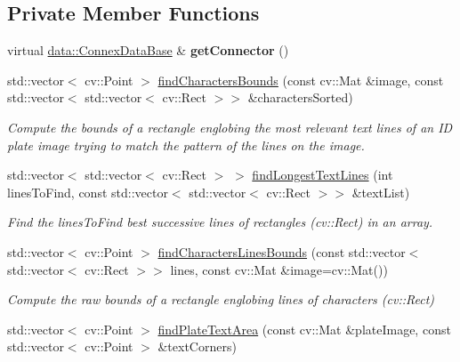 \subsection*{Private Member Functions}
\begin{DoxyCompactItemize}
\item 
\mbox{\label{classfilter_1_1algos_1_1_i_d_plate_rectifier_ad1ed6ad6aff33970529231ec52668020}} 
virtual \hyperlink{classfilter_1_1data_1_1_connex_data_base}{data\+::\+Connex\+Data\+Base} \& {\bfseries get\+Connector} ()
\item 
std\+::vector$<$ cv\+::\+Point $>$ \hyperlink{classfilter_1_1algos_1_1_i_d_plate_rectifier_a93c192fad7dd4402ac189be622e11615}{find\+Characters\+Bounds} (const cv\+::\+Mat \&image, const std\+::vector$<$ std\+::vector$<$ cv\+::\+Rect $>$$>$ \&characters\+Sorted)
\begin{DoxyCompactList}\small\item\em Compute the bounds of a rectangle englobing the most relevant text lines of an ID plate image trying to match the pattern of the lines on the image. \end{DoxyCompactList}\item 
std\+::vector$<$ std\+::vector$<$ cv\+::\+Rect $>$ $>$ \hyperlink{classfilter_1_1algos_1_1_i_d_plate_rectifier_a03f68f887de80fccf153d8896380e0c1}{find\+Longest\+Text\+Lines} (int lines\+To\+Find, const std\+::vector$<$ std\+::vector$<$ cv\+::\+Rect $>$$>$ \&text\+List)
\begin{DoxyCompactList}\small\item\em Find the lines\+To\+Find best successive lines of rectangles (cv\+::\+Rect) in an array. \end{DoxyCompactList}\item 
std\+::vector$<$ cv\+::\+Point $>$ \hyperlink{classfilter_1_1algos_1_1_i_d_plate_rectifier_aa3934265c0b997b5f18752e019a6ee11}{find\+Characters\+Lines\+Bounds} (const std\+::vector$<$ std\+::vector$<$ cv\+::\+Rect $>$$>$ lines, const cv\+::\+Mat \&image=cv\+::\+Mat())
\begin{DoxyCompactList}\small\item\em Compute the raw bounds of a rectangle englobing lines of characters (cv\+::\+Rect) \end{DoxyCompactList}\item 
std\+::vector$<$ cv\+::\+Point $>$ \hyperlink{classfilter_1_1algos_1_1_i_d_plate_rectifier_ad7e737a6b3e282191fcfc70277ec4a68}{find\+Plate\+Text\+Area} (const cv\+::\+Mat \&plate\+Image, const std\+::vector$<$ cv\+::\+Point $>$ \&text\+Corners)
$$
\end{DoxyCompactItemize}
